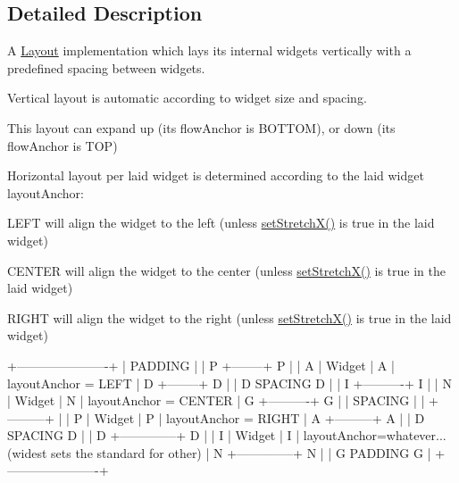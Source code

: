 \subsection{Detailed Description}
A \hyperlink{classcanvascv_1_1Layout}{Layout} implementation which lays it\textquotesingle{}s internal widgets vertically with a predefined spacing between widgets.
\begin{DoxyItemize}
\item Vertical layout is automatic according to widget size and spacing.
\begin{DoxyEnumerate}
\item This layout can expand up (it\textquotesingle{}s \textquotesingle{}flow\+Anchor\textquotesingle{} is B\+O\+T\+T\+OM), or down (it\textquotesingle{}s \textquotesingle{}flow\+Anchor\textquotesingle{} is T\+OP)
\end{DoxyEnumerate}
\item Horizontal layout per laid widget is determined according to the laid widget \textquotesingle{}layout\+Anchor\textquotesingle{}\+:
\begin{DoxyEnumerate}
\item L\+E\+FT will align the widget to the left (unless \hyperlink{classcanvascv_1_1Widget_a7cdddebd755c499712793f727a057733}{set\+Stretch\+X()} is true in the laid widget)
\item C\+E\+N\+T\+ER will align the widget to the center (unless \hyperlink{classcanvascv_1_1Widget_a7cdddebd755c499712793f727a057733}{set\+Stretch\+X()} is true in the laid widget)
\item R\+I\+G\+HT will align the widget to the right (unless \hyperlink{classcanvascv_1_1Widget_a7cdddebd755c499712793f727a057733}{set\+Stretch\+X()} is true in the laid widget) \begin{DoxyVerb}   +----------------------+
   |       PADDING        |
   | P +--------+       P |
   | A | Widget |       A |  layoutAnchor = LEFT
   | D +--------+       D |
   | D     SPACING      D |
   | I   +----------+   I |
   | N   |  Widget  |   N |  layoutAnchor = CENTER
   | G   +----------+   G |
   |       SPACING        |
   |        +---------+   |
   | P      | Widget  | P |  layoutAnchor = RIGHT
   | A      +---------+ A |
   | D     SPACING      D |
   | D +--------------+ D |
   | I |   Widget     | I |  layoutAnchor=whatever...(widest sets the standard for other)
   | N +--------------+ N |
   | G     PADDING      G |
   +----------------------+
\end{DoxyVerb}
 
\end{DoxyEnumerate}
\end{DoxyItemize}

